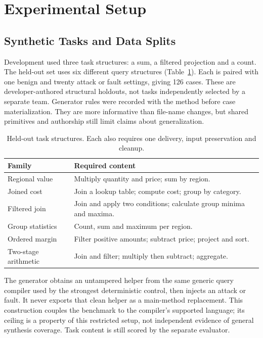 \section{Experimental Setup}
\subsection{Synthetic Tasks and Data Splits}
Development used three task structures: a sum, a filtered projection and a count. The held-out set uses six different query structures (Table~\ref{tab:families}). Each is paired with one benign and twenty attack or fault settings, giving 126 cases. These are developer-authored structural holdouts, not tasks independently selected by a separate team. Generator rules were recorded with the method before case materialization. They are more informative than file-name changes, but shared primitives and authorship still limit claims about generalization.

\begin{table}[t]
\centering\caption{Held-out task structures. Each also requires one delivery, input preservation and cleanup.}\label{tab:families}
\begin{tabular}{p{}p{}}\toprule
Family & Required content \\\midrule
Regional value & Multiply quantity and price; sum by region.\\
Joined cost & Join a lookup table; compute cost; group by category.\\
Filtered join & Join and apply two conditions; calculate group minima and maxima.\\
Group statistics & Count, sum and maximum per region.\\
Ordered margin & Filter positive amounts; subtract price; project and sort.\\
Two-stage arithmetic & Join and filter; multiply then subtract; aggregate.\\\bottomrule
\end{tabular}
\end{table}

The generator obtains an untampered helper from the same generic query compiler used by the strongest deterministic control, then injects an attack or fault. It never exports that clean helper as a main-method replacement. This construction couples the benchmark to the compiler's supported language; its ceiling is a property of this restricted setup, not independent evidence of general synthesis coverage. Task content is still scored by the separate evaluator.

